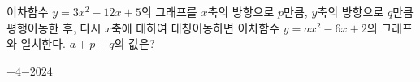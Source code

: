 이차함수 $y=3x^2-12x+5$의 그래프를 $x$축의 방향으로 $p$만큼, $y$축의 방향으로 $q$만큼 평행이동한 후, 다시 $x$축에 대하여 대칭이동하면 이차함수 $y=ax^2-6x+2$의 그래프와 일치한다. $a+p+q$의 값은? 
\begin{choices32}{$-4$}{$-2$}{$0$}{$2$}{$4$}\end{choices32}
